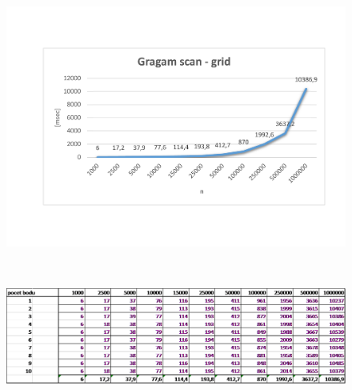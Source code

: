 \documentclass{article}
\begin{document}
\begin{figure}[htbp]
\centering
        \includegraphics[clip, trim=0cm 0cm 0cm 0cm, width=1\textwidth]{gg.pdf}
\end{figure}
\\
\begin{figure}[htbp]
\centering
        \includegraphics[clip, trim=0cm 0cm 0cm 0cm, width=1\textwidth]{gg.png}
\end{figure}
\clearpage
\newpage
\end{document}
